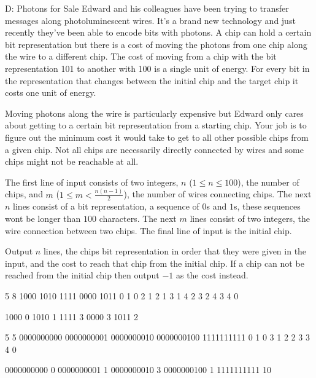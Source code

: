 \begin{problem}{D: Photons for Sale}
Edward and his colleagues have been trying to transfer messages along photoluminescent wires.
It's a brand new technology and just recently they've been able to encode bits with photons.
A chip can hold a certain bit representation but there is a cost of moving the photons from one chip along the wire to a different chip.
The cost of moving from a chip with the bit representation 101 to another with 100 is a single unit of energy.
For every bit in the representation that changes between the initial chip and the target chip it costs one unit of energy.

Moving photons along the wire is particularly expensive but Edward only cares about getting to a certain bit representation from a starting chip.
Your job is to figure out the minimum cost it would take to get to all other possible chips from a given chip.
Not all chips are necessarily directly connected by wires and some chips might not be reachable at all.
\end{problem}

\begin{formalin}
The first line of input consists of two integers, $n$ ($1 \leq n \leq 100$), the number of chips, and $m$ ($1 \leq m < \frac{n(n-1)}{2}$), the number of wires connecting chips.
The next $n$ lines consist of a bit representation, a sequence of $0$s and $1$s, these sequences wont be longer than $100$ characters.
The next $m$ lines consist of two integers, the wire connection between two chips.
The final line of input is the initial chip.
\end{formalin}

\begin{formalout}
Output $n$ lines, the chips bit representation in order that they were given in the input, and the cost to reach that chip from the initial chip.
If a chip can not be reached from the initial chip then output $-1$ as the cost instead.
\end{formalout}

\begin{datain}
5 8
1000
1010
1111
0000
1011
0 1
0 2
1 2
1 3
1 4
2 3
2 4
3 4
0
\end{datain}
\begin{dataout}
1000 0
1010 1
1111 3
0000 3
1011 2
\end{dataout}
\begin{datain}
5 5
0000000000
0000000001
0000000010
0000000100
1111111111
0 1
0 3
1 2
2 3
3 4
0
\end{datain}
\begin{dataout}
0000000000 0
0000000001 1
0000000010 3
0000000100 1
1111111111 10
\end{dataout}
